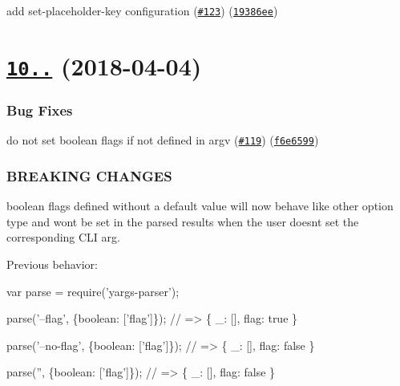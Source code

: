 \begin{DoxyItemize}
\item add {\ttfamily set-\/placeholder-\/key} configuration (\href{https://github.com/yargs/yargs-parser/issues/123}{\tt \#123}) (\href{https://github.com/yargs/yargs-parser/commit/19386ee}{\tt 19386ee})
\end{DoxyItemize}

\label{_10.0.0}%
 \section*{\href{https://github.com/yargs/yargs-parser/compare/v9.0.2...v10.0.0}{\tt 10..} (2018-\/04-\/04)}

\subsubsection*{Bug Fixes}


\begin{DoxyItemize}
\item do not set boolean flags if not defined in {\ttfamily argv} (\href{https://github.com/yargs/yargs-parser/issues/119}{\tt \#119}) (\href{https://github.com/yargs/yargs-parser/commit/f6e6599}{\tt f6e6599})
\end{DoxyItemize}

\subsubsection*{B\+R\+E\+A\+K\+I\+NG C\+H\+A\+N\+G\+ES}


\begin{DoxyItemize}
\item {\ttfamily boolean} flags defined without a {\ttfamily default} value will now behave like other option type and won\textquotesingle{}t be set in the parsed results when the user doesn\textquotesingle{}t set the corresponding C\+LI arg.
\end{DoxyItemize}

Previous behavior\+: 
\begin{DoxyCode}
var parse = require('yargs-parser');

parse('--flag', \{boolean: ['flag']\});
// => \{ \_: [], flag: true \}

parse('--no-flag', \{boolean: ['flag']\});
// => \{ \_: [], flag: false \}

parse('', \{boolean: ['flag']\});
// => \{ \_: [], flag: false \}
\end{DoxyCode}


